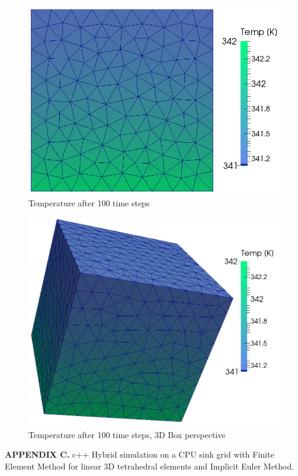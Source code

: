 \documentclass[12pt]{article}
\begin{document}
	\begin{figure}[H]
    \includegraphics[scale=0.4]{box-sequential/boxSequential_ts100.png}
    \centering
    \caption{Temperature after 100 time steps}
	\end{figure}	
	\begin{figure}[H]
    \includegraphics[scale=0.3]{box-sequential/box3dview.png}
    \centering
    \caption{Temperature after 100 time steps, 3D Box perspective}
	\end{figure}	

\textbf{APPENDIX C.} c++ Hybrid simulation on a CPU sink grid with Finite Element Method for linear 3D tetrahedral elements and Implicit Euler Method.
	
\end{document}
